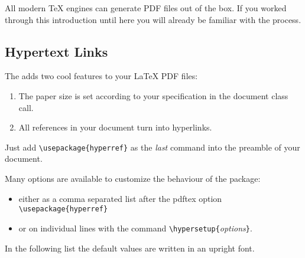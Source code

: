 All modern \TeX{} engines can generate PDF files out of the box. If you worked through this introduction until here you will already be familiar with the process.

\subsection{Hypertext Links}
\label{ssec:pdfhyperref}

The  adds two cool features to your \LaTeX{} PDF files:

\begin{enumerate}
\item The paper size is set according to your specification in the document class call.
\item All references in your document turn into hyperlinks.
\end{enumerate}

Just add \verb+\usepackage{hyperref}+ as the \emph{last} command into
the preamble of your document.

Many options are available to customize the behaviour of the
 package:
\begin{itemize}
\item either as a comma separated list after the pdftex option\\
  \verb+\usepackage{hyperref}+
\item or on individual lines with the command
  \verb+\hypersetup{+\emph{options}\verb+}+.
\end{itemize}

In the following
list the default values are written in an upright font.

